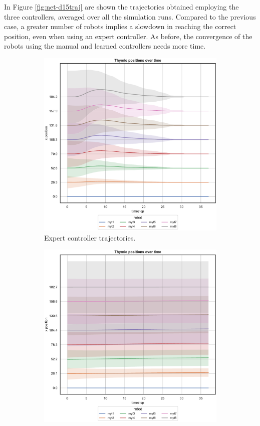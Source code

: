 In Figure \ref{fig:net-d15traj} are shown the trajectories obtained employing 
the three controllers, averaged over all the simulation runs.
Compared to the previous case, a greater number of robots implies a 
slowdown in reaching the correct position, even when using an expert 
controller.
As before, the convergence of the robots using the manual and learned 
controllers needs more time.
\begin{figure}[!htb]
	\begin{center}
		\begin{subfigure}[h]{0.49\textwidth}
			\centering
			\includegraphics[width=.9\textwidth]{contents/images/net-d15/position-overtime-omniscient}%
			\caption{Expert controller trajectories.}
		\end{subfigure}
		\hfill
		\begin{subfigure}[h]{0.49\textwidth}
			\centering
			\includegraphics[width=.9\textwidth]{contents/images/net-d15/position-overtime-learned_distributed}

\end{subfigure}
\end{center}
\end{figure}
